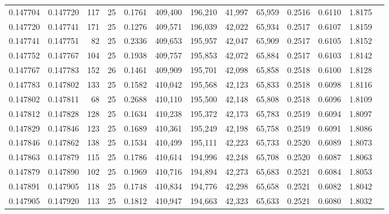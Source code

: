 \begin{tabular}{rrrrrrrrrrrrr}
0.147704 & 0.147720 &   117 &  25 &                                     0.1761 & 409,400 & 196,210 &  41,997 &  65,959 & 0.2516 & 0.6110 & 1.8175 \\
0.147720 & 0.147741 &   171 &  25 &                                     0.1276 & 409,571 & 196,039 &  42,022 &  65,934 & 0.2517 & 0.6107 & 1.8159 \\
0.147741 & 0.147751 &    82 &  25 &                                     0.2336 & 409,653 & 195,957 &  42,047 &  65,909 & 0.2517 & 0.6105 & 1.8152 \\
0.147752 & 0.147767 &   104 &  25 &                                     0.1938 & 409,757 & 195,853 &  42,072 &  65,884 & 0.2517 & 0.6103 & 1.8142 \\
0.147767 & 0.147783 &   152 &  26 &                                     0.1461 & 409,909 & 195,701 &  42,098 &  65,858 & 0.2518 & 0.6100 & 1.8128 \\
0.147783 & 0.147802 &   133 &  25 &                                     0.1582 & 410,042 & 195,568 &  42,123 &  65,833 & 0.2518 & 0.6098 & 1.8116 \\
0.147802 & 0.147811 &    68 &  25 &                                     0.2688 & 410,110 & 195,500 &  42,148 &  65,808 & 0.2518 & 0.6096 & 1.8109 \\
0.147812 & 0.147828 &   128 &  25 &                                     0.1634 & 410,238 & 195,372 &  42,173 &  65,783 & 0.2519 & 0.6094 & 1.8097 \\
0.147829 & 0.147846 &   123 &  25 &                                     0.1689 & 410,361 & 195,249 &  42,198 &  65,758 & 0.2519 & 0.6091 & 1.8086 \\
0.147846 & 0.147862 &   138 &  25 &                                     0.1534 & 410,499 & 195,111 &  42,223 &  65,733 & 0.2520 & 0.6089 & 1.8073 \\
0.147863 & 0.147879 &   115 &  25 &                                     0.1786 & 410,614 & 194,996 &  42,248 &  65,708 & 0.2520 & 0.6087 & 1.8063 \\
0.147879 & 0.147890 &   102 &  25 &                                     0.1969 & 410,716 & 194,894 &  42,273 &  65,683 & 0.2521 & 0.6084 & 1.8053 \\
0.147891 & 0.147905 &   118 &  25 &                                     0.1748 & 410,834 & 194,776 &  42,298 &  65,658 & 0.2521 & 0.6082 & 1.8042 \\
0.147905 & 0.147920 &   113 &  25 &                                     0.1812 & 410,947 & 194,663 &  42,323 &  65,633 & 0.2521 & 0.6080 & 1.8032 \\

\end{tabular}
